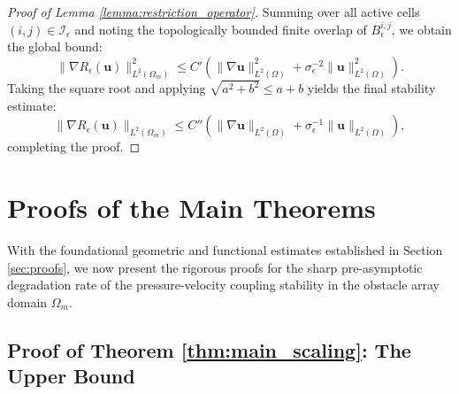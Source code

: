 \documentclass{elsarticle}
\begin{document}
\begin{proof}[Proof of Lemma \ref{lemma:restriction_operator}]
    Summing over all active cells $(i,j) \in \mathcal{I}_{\epsilon}$ and noting the topologically bounded finite overlap of $B_{\epsilon}^{i,j}$, we obtain the global bound:
    \begin{equation}
        \|\nabla R_{\epsilon}(\mathbf{u})\|_{L^2(\Omega_m)}^2 \le C' \left( \|\nabla \mathbf{u}\|_{L^2(\Omega)}^2 + \sigma_{\epsilon}^{-2} \|\mathbf{u}\|_{L^2(\Omega)}^2 \right).
    \end{equation}
    Taking the square root and applying $\sqrt{a^2 + b^2} \le a + b$ yields the final stability estimate:
    \begin{equation}
        \|\nabla R_{\epsilon}(\mathbf{u})\|_{L^2(\Omega_m)} \le C'' \left( \|\nabla \mathbf{u}\|_{L^2(\Omega)} + \sigma_{\epsilon}^{-1} \|\mathbf{u}\|_{L^2(\Omega)} \right),
    \end{equation}
    completing the proof.
\end{proof}

\section{Proofs of the Main Theorems}\label{sec:proofs_main}

With the foundational geometric and functional estimates established in Section \ref{sec:proofs}, we now present the rigorous proofs for the sharp pre-asymptotic degradation rate of the pressure-velocity coupling stability in the obstacle array domain $\Omega_m$.

\subsection{Proof of Theorem \ref{thm:main_scaling}: The Upper Bound}
\end{document}
